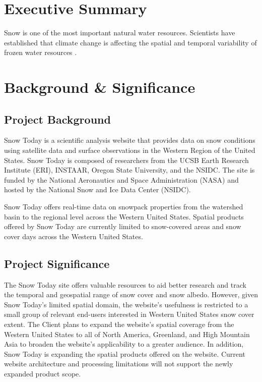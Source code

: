 \documentclass[
]{book}
\begin{document}
\hypertarget{exec_summary}{%
\chapter{Executive Summary}\label{exec_summary}}

Snow is one of the most important natural water resources. Scientists have established that climate change is affecting the spatial and temporal variability of frozen water resources \citep{newton2021}.

\hypertarget{background}{%
\chapter{Background \& Significance}\label{background}}

\hypertarget{project-background}{%
\section{Project Background}\label{project-background}}

Snow Today is a scientific analysis website that provides data on snow conditions using satellite data and surface observations in the Western Region of the United States. Snow Today is composed of researchers from the UCSB Earth Research Institute (ERI), INSTAAR, Oregon State University, and the NSIDC. The site is funded by the National Aeronautics and Space Administration (NASA) and hosted by the National Snow and Ice Data Center (NSIDC).

Snow Today offers real-time data on snowpack properties from the watershed basin to the regional level across the Western United States. Spatial products offered by Snow Today are currently limited to snow-covered areas and snow cover days across the Western United States.

\hypertarget{project-significance}{%
\section{Project Significance}\label{project-significance}}

The Snow Today site offers valuable resources to aid better research and track the temporal and geospatial range of snow cover and snow albedo. However, given Snow Today's limited spatial domain, the website's usefulness is restricted to a small group of relevant end-users interested in Western United States snow cover extent. The Client plans to expand the website's spatial coverage from the Western United States to all of North America, Greenland, and High Mountain Asia to broaden the website's applicability to a greater audience. In addition, Snow Today is expanding the spatial products offered on the website. Current website architecture and processing limitations will not support the newly expanded product scope.
\end{document}
